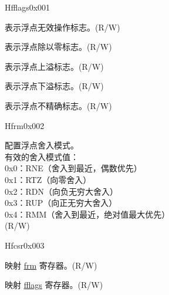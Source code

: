 \begin{register}{H}{fflags}{0x001}\label{regdesc:FFLAGS}
%
%
%
%
%
%
\regnewline%
\begin{regdesc}\begin{reglist}
\label{fielddesc:FFLAGS_NV}\item [NV] 表示浮点无效操作标志。(R/W)
\label{fielddesc:FFLAGS_DZ}\item [DZ] 表示浮点除以零标志。(R/W)
\label{fielddesc:FFLAGS_OF}\item [OF] 表示浮点上溢标志。(R/W)
\label{fielddesc:FFLAGS_UF}\item [UF] 表示浮点下溢标志。(R/W)
\label{fielddesc:FFLAGS_NX}\item [NX] 表示浮点不精确标志。(R/W)
\end{reglist}\end{regdesc}
\end{register}

\begin{register}{H}{frm}{0x002}\label{regdesc:FRM}
%
%
\regnewline%
\begin{regdesc}\begin{reglist}
\label{fielddesc:FRM}\item [FRM] 配置浮点舍入模式。\\
有效的舍入模式值：\\
0x0：RNE（舍入到最近，偶数优先）\\
0x1：RTZ（向零舍入）\\
0x2：RDN（向负无穷大舍入）\\
0x3：RUP（向正无穷大舍入）\\
0x4：RMM（舍入到最近，绝对值最大优先）\\
(R/W)
\end{reglist}\end{regdesc}
\end{register}

\begin{register}{H}{fcsr}{0x003}\label{regdesc:FCSR}
%
%
%
\regnewline%
\begin{regdesc}\begin{reglist}
\label{fielddesc:FCSR_FRM}\item [FRM] 映射 \hyperref[regdesc:FRM]{frm} 寄存器。(R/W)
\label{fielddesc:FCSR_FFLAGS}\item [FFLAGS] 映射 \hyperref[regdesc:FFLAGS]{fflags} 寄存器。(R/W)
\end{reglist}\end{regdesc}
\end{register}

